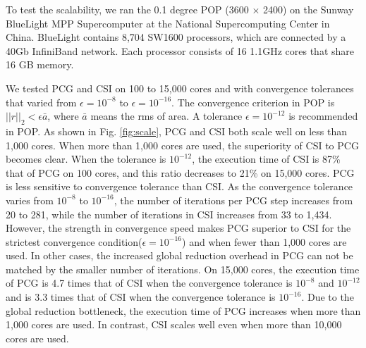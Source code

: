 To test the scalability, we ran the 0.1 degree POP (3600 $\times$ 2400) on the Sunway BlueLight MPP Supercomputer at the National Supercomputing Center in China.  BlueLight contains 8,704 SW1600 processors, which are connected by a 40Gb InfiniBand network. Each processor consists of 16 1.1GHz cores that share 16 GB memory. 

We tested PCG and CSI on 100 to 15,000 cores and with convergence tolerances that varied from $\epsilon = 10^{-8}$ to $\epsilon = 10^{-16}$. The convergence criterion in POP is $||r||_2<\epsilon \bar{a}$, where $\bar{a}$ means the rms of area. A tolerance $\epsilon = 10^{-12}$ is recommended in POP. As shown in Fig. \ref{fig:scale}, PCG and CSI both scale well on less than 1,000 cores. When more than 1,000 cores are used, the superiority of CSI to PCG becomes clear. When the tolerance is $10^{-12}$, the execution time of CSI is 87\% that of PCG on 100 cores, and this ratio decreases to 21\% on 15,000 cores. PCG is less sensitive to convergence tolerance than CSI.  As the convergence tolerance varies from $10^{-8}$ to $10^{-16}$, the number of iterations per PCG step increases from 20 to 281, while the number of iterations in CSI increases from 33 to 1,434. However, the strength in convergence speed makes PCG superior to CSI for the strictest convergence condition($\epsilon = 10^{-16}$) and when fewer than 1,000 cores are used. In other cases, the increased global reduction overhead in PCG can not be matched by the smaller number of iterations. On 15,000 cores, the execution time of PCG is 4.7 times that of CSI when the convergence tolerance is $10^{-8}$ and $10^{-12}$ and is 3.3 times that of CSI when the convergence tolerance is $10^{-16}$. Due to the global reduction bottleneck, the execution time of PCG increases when more than 1,000 cores are used. In contrast, CSI scales well even when more than 10,000 cores are used.

